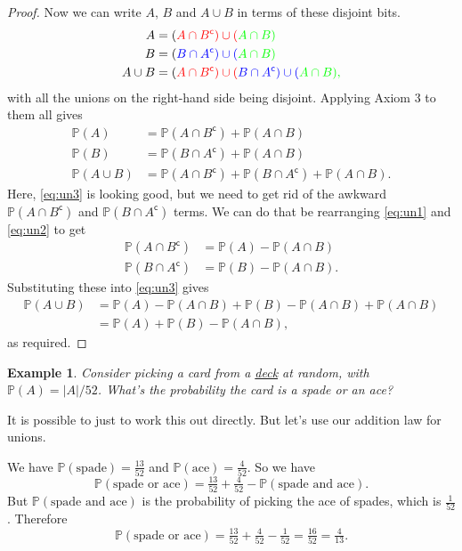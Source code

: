 \documentclass[
  a4paper,
]{book}
\theoremstyle{definition}
\theoremstyle{definition}
\newtheorem{example}{Example}[chapter]
\theoremstyle{definition}
\theoremstyle{definition}
\theoremstyle{remark}
\begin{document}
\begin{proof}
Now we can write \(A\), \(B\) and \(A \cup B\) in terms of these disjoint bits.
\begin{align}
A &= (\color{red}{A \cap B^\mathsf{c}}) \cup (\color{green}{A \cap B}) \\
B &= (\color{blue}{B \cap A^\mathsf{c}}) \cup (\color{green}{A \cap B}) \\
A \cup B &= (\color{red}{A \cap B^\mathsf{c}}) \cup (\color{blue}{B \cap A^\mathsf{c}}) \cup (\color{green}{A \cap B}),
\end{align}
with all the unions on the right-hand side being disjoint. Applying Axiom 3 to them all gives
\begin{align}
\mathbb P(A) &= \mathbb P(A \cap B^\mathsf{c}) + \mathbb P(A \cap B) \label{eq:un1}  \\
\mathbb P(B) &= \mathbb P(B \cap A^\mathsf{c}) + \mathbb P(A \cap B)  \label{eq:un2} \\
\mathbb P(A \cup B) &= \mathbb P(A \cap B^\mathsf{c}) + \mathbb P(B \cap A^\mathsf{c}) + \mathbb P(A \cap B) . \label{eq:un3}
\end{align}
Here, \eqref{eq:un3} is looking good, but we need to get rid of the awkward \(\mathbb P(A \cap B^\mathsf{c})\) and \(\mathbb P(B \cap A^\mathsf{c})\) terms. We can do that be rearranging \eqref{eq:un1} and \eqref{eq:un2} to get
\begin{align}
\mathbb P(A \cap B^\mathsf{c}) &= \mathbb P(A) - \mathbb P(A \cap B) \\
\mathbb P(B \cap A^\mathsf{c}) &= \mathbb P(B) - \mathbb P(A \cap B) .
\end{align}
Substituting these into \eqref{eq:un3} gives
\begin{align}
\mathbb P(A \cup B) &= \mathbb P(A) - \mathbb P(A \cap B) + \mathbb P(B) - \mathbb P(A \cap B) + \mathbb P(A \cap B) \\
  &= \mathbb P(A)+ \mathbb P(B) - \mathbb P(A \cap B) ,
\end{align}
as required.
\end{proof}

\begin{example}
\emph{Consider picking a card from a \href{https://en.wikipedia.org/wiki/Standard_52-card_deck}{deck} at random, with \(\mathbb P(A) = |A|/52\). What's the probability the card is a spade or an ace?}

It is possible to just to work this out directly. But let's use our addition law for unions.

We have \(\mathbb P(\text{spade}) = \frac{13}{52}\) and \(\mathbb P(\text{ace}) = \frac{4}{52}\). So we have
\[ \mathbb P(\text{spade or ace}) = \tfrac{13}{52} + \tfrac{4}{52} - \mathbb P(\text{spade and ace}) . \]
But \(\mathbb P(\text{spade and ace})\) is the probability of picking the ace of spades, which is \(\frac{1}{52}\). Therefore
\[ \mathbb P(\text{spade or ace}) = \tfrac{13}{52} + \tfrac{4}{52}  - \tfrac{1}{52} = \tfrac{16}{52} = \tfrac{4}{13} . \]
\end{example}
\end{document}
